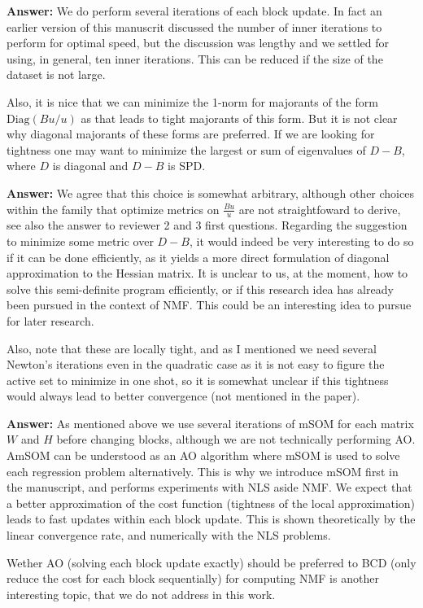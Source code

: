 \documentclass[10pt]{article} %
\newcommand{\answer}[1]{{\textbf{Answer:} \color{blue} #1}}
\begin{document}
\answer{We do perform several iterations of each block update. In fact an earlier version of this manuscrit discussed the number of inner iterations to perform for optimal speed, but the discussion was lengthy and we settled for using, in general, ten inner iterations. This can be reduced if the size of the dataset is not large.}

Also, it is nice that we can minimize the 1-norm for majorants of the form $\text{Diag}(Bu/u)$ as that leads to tight majorants of this form. But it is not clear why diagonal majorants of these forms are preferred. If we are looking for tightness one may want to minimize the largest or sum of eigenvalues of $D-B$, where $D$ is diagonal and $D-B$ is SPD. 

\answer{We agree that this choice is somewhat arbitrary, although other choices within the family that optimize metrics on $\frac{Bu}{u}$ are not straightfoward to derive, see also the answer to reviewer 2 and 3 first questions. Regarding the suggestion to minimize some metric over $D-B$, it would indeed be very interesting to do so if it can be done efficiently, as it yields a more direct formulation of diagonal approximation to the Hessian matrix. It is unclear to us, at the moment, how to solve this semi-definite program efficiently, or if this research idea has already been pursued in the context of NMF. This could be an interesting idea to pursue for later research.}

Also, note that these are locally tight, and as I mentioned we need several Newton's iterations even in the quadratic case as it is not easy to figure the active set to minimize in one shot, so it is somewhat unclear if this tightness would always lead to better convergence (not mentioned in the paper).

\answer{As mentioned above we use several iterations of mSOM for each matrix $W$ and $H$ before changing blocks, although we are not technically performing AO. AmSOM can be understood as an AO algorithm where mSOM is used to solve each regression problem alternatively. This is why we introduce mSOM first in the manuscript, and performs experiments with NLS aside NMF. We expect that a better approximation of the cost function (tightness of the local approximation) leads to fast updates within each block update. This is shown theoretically by the linear convergence rate, and numerically with the NLS problems.

Wether AO (solving each block update exactly) should be preferred to BCD (only reduce the cost for each block sequentially) for computing NMF is another interesting topic, that we do not address in this work.}
\end{document}
